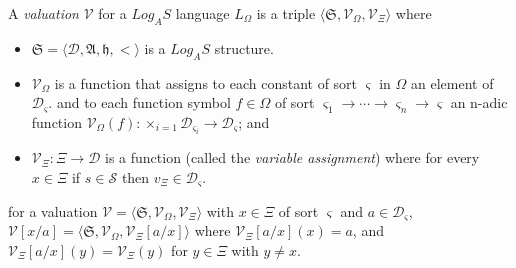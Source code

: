 \begin{defn}
  A \textit{valuation} $\mathcal{V}$ for a $Log_AS$ language $L_{\Omega}$ is a triple $\langle \mathfrak{S}, \mathcal{V}_{\Omega}, \mathcal{V}_{\Xi} \rangle$ where
\end{defn}
\begin{itemize}
  \item $\mathfrak{S} = \langle \mathcal{D}, \mathfrak{A}, \mathfrak{h}, < \rangle$ is a $Log_AS$ structure.
  \item $\mathcal{V}_{\Omega}$ is a function that assigns to each constant of sort $\varsigma$ in $\Omega$ an element of $\mathcal{D}_{\varsigma}$.
        and to each function symbol $f \in \Omega$ of sort $\varsigma_1 \to \cdots \to \varsigma_n \to \varsigma$ an
        n-adic function $\mathcal{V}_{\Omega}(f) :  \times_{i=1} \mathcal{D}_{\varsigma_i} \to \mathcal{D}_{\varsigma}$; and
  \item $\mathcal{V}_{\Xi} : \Xi \to \mathcal{D}$ is a function (called the \textit{variable assignment}) where
        for every $x \in \Xi$ if $s \in \mathcal{S}$ then $v_{\Xi} \in \mathcal{D}_{\varsigma}$.
\end{itemize}

for a valuation $\mathcal{V} = \langle \mathfrak{S}, \mathcal{V}_{\Omega}, \mathcal{V}_{\Xi} \rangle$ with
$x \in \Xi$ of sort $\varsigma$ and $a \in \mathcal{D}_{\varsigma}$, $\mathcal{V}[x/a] = \langle \mathfrak{S}, \mathcal{V}_{\Omega}, \mathcal{V}_{\Xi}[a/x] \rangle$
where $\mathcal{V}_{\Xi}[a/x](x) = a$, and $\mathcal{V}_{\Xi}[a/x](y) = \mathcal{V}_{\Xi}(y)$ for $y \in \Xi$ with $y \neq x$.


